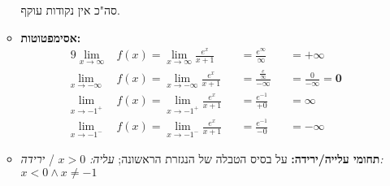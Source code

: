 \documentclass[]{article}
\newcommand\limi  {\lim_{x \to \infty}}
\newcommand\limni {\lim_{x \to - \infty}}
\renewcommand\inf {\infty}
\begin{document}
\begin{enumerate}
\begin{itemize}
\begin{center}
			\end{center}
			סה"כ אין נקודות עוקף. 
			\item \textbf{אסימפטוטות: }
			\begin{alignat*}{9}
				\limi &f(x) = \limi \frac{e^x}{x + 1} &&= \frac{e^\inf}{\inf} &&= \bm{+ \inf} \\
				\limni &f(x) = \limni \frac{e^x}{x + 1} &&= \frac{\frac{e}{\inf}}{-\inf} &&= \frac{0}{-\inf} = \bm{0} \\
				\lim_{x \to -1^+} &f(x) = \lim_{x \to -1^+} \frac{e^{x}}{x + 1} &&= \frac{e^{-1}}{+0} &&= \bm{\inf} \\
				\lim_{x \to -1^-} &f(x) = \lim_{x \to -1^-} \frac{e^{x}}{x + 1} &&= \frac{e^{-1}}{-0} &&= \bm{- \inf }
			\end{alignat*}
			\item \textbf{תחומי עלייה/ירידה: }על בסיס הטבלה של הנגזרת הראשונה; \textit{עליה: }$x > 0$ /  \textit{ירידה: }$x < 0 \land x \neq -1$
			

\end{itemize}
\end{enumerate}
\end{document}
